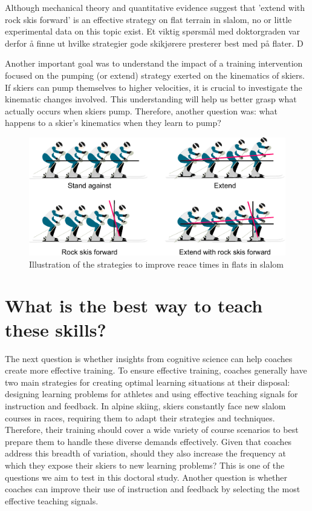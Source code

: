 Although mechanical theory and quantitative evidence suggest that 'extend with rock skis forward' is an effective strategy on flat terrain in slalom, no or little experimental data on this topic exist. Et viktig spørsmål med doktorgraden var derfor å finne ut hvilke strategier gode skikjørere presterer best med på flater. D


Another important goal was to understand the impact of a training intervention focused on the pumping (or extend) strategy exerted on the kinematics of skiers. If skiers can pump themselves to higher velocities, it is crucial to investigate the kinematic changes involved. This understanding will help us better grasp what actually occurs when skiers pump. Therefore, another question was: what happens to a skier's kinematics when they learn to pump?


\begin{figure}[H]
    \centering
    \includegraphics[width=1\linewidth]{figure/figure_introduction_strategies.pdf}
    \caption{Illustration of the strategies to improve reace times in flats in slalom}
    \label{fig: strategies}
\end{figure}



\section{What is the best way to teach these skills?}
The next question is whether insights from cognitive science can help coaches create more effective training. To ensure effective training, coaches generally have two main strategies for creating optimal learning situations at their disposal: designing learning problems for athletes and using effective teaching signals for instruction and feedback. In alpine skiing, skiers constantly face new slalom courses in races, requiring them to adapt their strategies and techniques. Therefore, their training should cover a wide variety of course scenarios to best prepare them to handle these diverse demands effectively. Given that coaches address this breadth of variation, should they also increase the frequency at which they expose their skiers to new learning problems? This is one of the questions we aim to test in this doctoral study. Another question is whether coaches can improve their use of instruction and feedback by selecting the most effective teaching signals.



